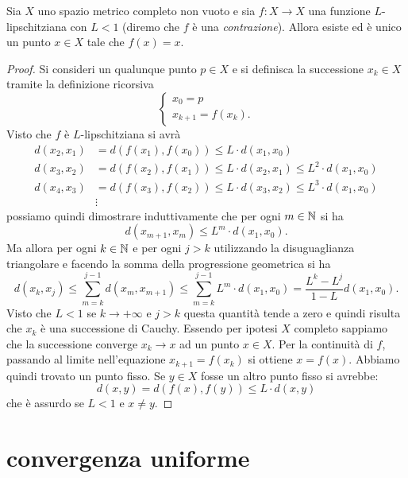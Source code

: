 \begin{theorem}
\mymark{***}%
%
%
%
%
%
\label{th:banach-caccioppoli}
Sia $X$ uno spazio metrico completo non vuoto e sia $f\colon X \to X$ una funzione $L$-lipschitziana con $L<1$ (diremo che $f$ è una \emph{contrazione}).
Allora esiste ed è unico un punto
$x\in X$ tale che $f(x) = x$.
\end{theorem}
%
\begin{proof}
\mymark{***}
Si consideri un qualunque punto $p \in X$ e si definisca
la successione $x_k\in X$ tramite la definizione ricorsiva
\[
\begin{cases}
  x_0 = p \\
  x_{k+1} = f(x_k).
\end{cases}
\]
Visto che $f$ è $L$-lipschitziana si avrà
\begin{align*}
  d(x_2, x_1) &= d(f(x_1),f(x_0)) \le L \cdot d(x_1,x_0) \\
  d(x_3, x_2) &= d(f(x_2),f(x_1)) \le L \cdot d(x_2,x_1)
  \le L^2 \cdot d(x_1, x_0) \\
  d(x_4, x_3) &= d(f(x_3),f(x_2)) \le L \cdot d(x_3,x_2)
  \le L^3 \cdot d(x_1, x_0) \\
  &\vdots
\end{align*}
possiamo quindi dimostrare induttivamente che
per ogni $m\in \mathbb N$ si ha
\[
  d(x_{m+1}, x_m) \le L^m \cdot d(x_1, x_0).
\]
Ma allora per ogni $k\in \mathbb N$ e per ogni $j>k$
utilizzando la disuguaglianza triangolare e facendo la somma della progressione geometrica
si ha
\[
  d(x_k,x_j) \le \sum_{m=k}^{j-1} d(x_m, x_{m+1})
   \le \sum_{m=k}^{j-1} L^m \cdot d(x_1, x_0)
   = \frac{L^k-L^j}{1-L} d(x_1,x_0).
\]
Visto che $L<1$ se $k\to +\infty$ e $j>k$ questa quantità tende a zero e quindi
risulta che $x_k$ è una successione di Cauchy. Essendo per ipotesi $X$ completo sappiamo che la successione converge $x_k \to x$ ad un punto $x\in X$.
Per la continuità di $f$, passando al limite nell'equazione
$x_{k+1} = f(x_k)$ si ottiene $x = f(x)$.
Abbiamo quindi trovato un punto fisso.
Se $y\in X$ fosse un altro punto fisso si avrebbe:
\[
  d(x,y) = d(f(x),f(y)) \le L \cdot d(x,y)
\]
che è assurdo se $L<1$ e $x\neq y$.
\end{proof}

\section{convergenza uniforme}

